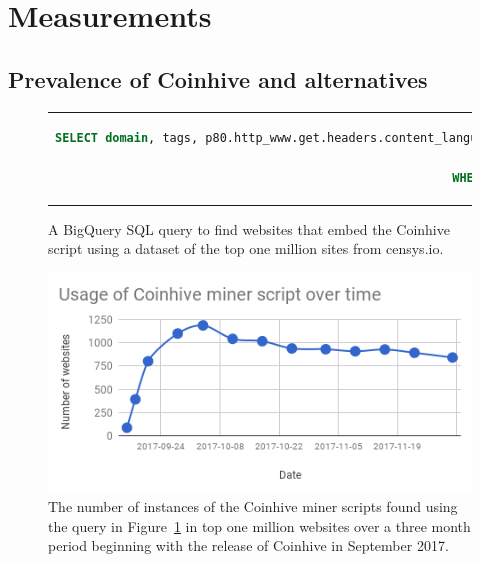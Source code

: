 %
%
%
%
%
%

\section{Measurements}

\subsection{Prevalence of Coinhive and alternatives}

\begin{figure}[t]
\begin{tabular}{c}
\begin{lstlisting}[language=sql]
SELECT domain, tags, p80.http_www.get.headers.content_language, p80.http_www.get.headers.server, p80.http.get.headers.x_powered_by, p80.http.get.title, p80.http_www.get.body as wwwbody, p80.http.get.body as plainbody 
FROM censys-io.domain_public.20171123
WHERE STRPOS(p80.http.get.body, coinhive.min.js) > 0 or STRPOS(p80.http_www.get.body, coinhive.min.js) >0)
\end{lstlisting}
\end{tabular}
\caption{A BigQuery SQL query to find websites that embed the Coinhive script using a dataset of the top one million sites from censys.io. \label{lst:bigquery}}
\end{figure}

\begin{figure}[t]
\centering
\includegraphics[width=\linewidth]{figures/usage_of_coinhive_over_time.png}
\caption{The number of instances of the Coinhive miner scripts found using the query in Figure~\ref{lst:bigquery} in top one million websites over a three month period beginning with the release of Coinhive in September 2017.\label{fig:topmil}}
\end{figure}

